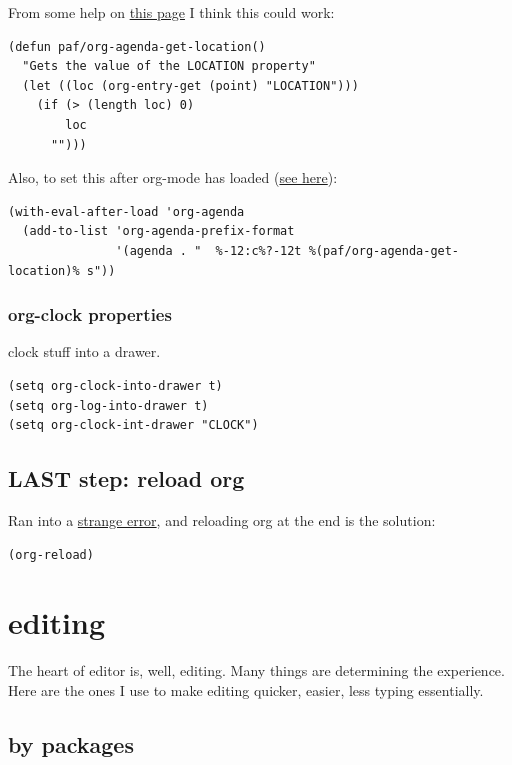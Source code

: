 \documentclass[11pt]{article}
\begin{document}
\begin{enumerate}
From some help on \href{https://emacs.stackexchange.com/questions/26249/customize-text-after-task-in-custom-org-agenda-view}{this page} I think this could work:

\begin{verbatim}
(defun paf/org-agenda-get-location()
  "Gets the value of the LOCATION property"
  (let ((loc (org-entry-get (point) "LOCATION")))
    (if (> (length loc) 0)
        loc
      "")))
\end{verbatim}

Also, to set this after org-mode has loaded (\href{https://emacs.stackexchange.com/questions/19091/how-to-set-org-agenda-prefix-format-before-org-agenda-starts}{see here}):
\begin{verbatim}
(with-eval-after-load 'org-agenda
  (add-to-list 'org-agenda-prefix-format
               '(agenda . "  %-12:c%?-12t %(paf/org-agenda-get-location)% s"))
\end{verbatim}
\end{enumerate}
\subsubsection{org-clock properties}
\label{sec:orgf17ee6b}
clock stuff into a drawer.
\begin{verbatim}
(setq org-clock-into-drawer t)
(setq org-log-into-drawer t)
(setq org-clock-int-drawer "CLOCK")
\end{verbatim}
\subsection{LAST step: reload org}
\label{sec:org21cccce}

Ran into a \href{https://github.com/seagle0128/.emacs.d/issues/129}{strange error}, and reloading org at the end is the
solution:

\begin{verbatim}
(org-reload)
\end{verbatim}
\section{editing}
\label{sec:org580d36a}

The heart of editor is, well, editing. Many things are determining the
experience. Here are the ones I use to make editing quicker, easier,
less typing essentially.

\subsection{by packages}
\label{sec:org0439641}
\end{document}

